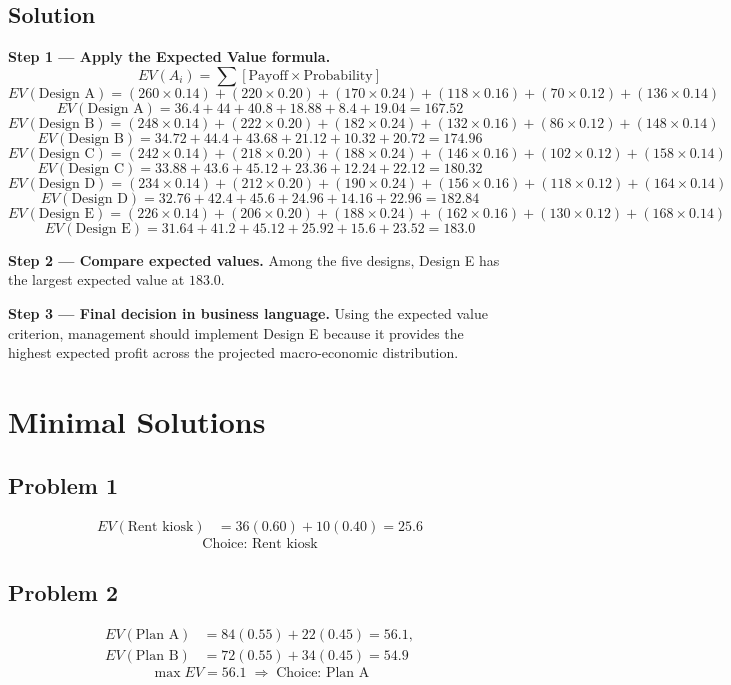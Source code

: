 \begin{ExamProblems}
		\subsection*{Solution}
		\textbf{Step 1 --- Apply the Expected Value formula.}
		\[
		EV(A_i)=\sum [\text{Payoff}\times\text{Probability}]
		\]
		\[
		EV(\text{Design A})=(260\times0.14)+(220\times0.20)+(170\times0.24)+(118\times0.16)+(70\times0.12)+(136\times0.14)
		\]
		\[
		EV(\text{Design A})=36.4+44+40.8+18.88+8.4+19.04=167.52
		\]
		\[
		EV(\text{Design B})=(248\times0.14)+(222\times0.20)+(182\times0.24)+(132\times0.16)+(86\times0.12)+(148\times0.14)
		\]
		\[
		EV(\text{Design B})=34.72+44.4+43.68+21.12+10.32+20.72=174.96
		\]
		\[
		EV(\text{Design C})=(242\times0.14)+(218\times0.20)+(188\times0.24)+(146\times0.16)+(102\times0.12)+(158\times0.14)
		\]
		\[
		EV(\text{Design C})=33.88+43.6+45.12+23.36+12.24+22.12=180.32
		\]
		\[
		EV(\text{Design D})=(234\times0.14)+(212\times0.20)+(190\times0.24)+(156\times0.16)+(118\times0.12)+(164\times0.14)
		\]
		\[
		EV(\text{Design D})=32.76+42.4+45.6+24.96+14.16+22.96=182.84
		\]
		\[
		EV(\text{Design E})=(226\times0.14)+(206\times0.20)+(188\times0.24)+(162\times0.16)+(130\times0.12)+(168\times0.14)
		\]
		\[
		EV(\text{Design E})=31.64+41.2+45.12+25.92+15.6+23.52=183.0
		\]
		
		\textbf{Step 2 --- Compare expected values.}
		Among the five designs, Design E has the largest expected value at $183.0$.
		
		\textbf{Step 3 --- Final decision in business language.}
		Using the expected value criterion, management should implement Design E because it provides the highest expected profit across the projected macro-economic distribution.
		\end{ExamProblems}

	\section{Minimal Solutions}
	\subsection*{Problem 1}
	\[
	\begin{aligned}
	EV(\text{Rent kiosk}) &= 36(0.60)+10(0.40)=25.6
	\end{aligned}
	\]
	\[
	\text{Choice: Rent kiosk}
	\]

	\subsection*{Problem 2}
	\[
	\begin{aligned}
	EV(\text{Plan A}) &= 84(0.55)+22(0.45)=56.1,\\
	EV(\text{Plan B}) &= 72(0.55)+34(0.45)=54.9
	\end{aligned}
	\]
	\[
	\max EV = 56.1 \;\Rightarrow\; \text{Choice: Plan A}
	\]

